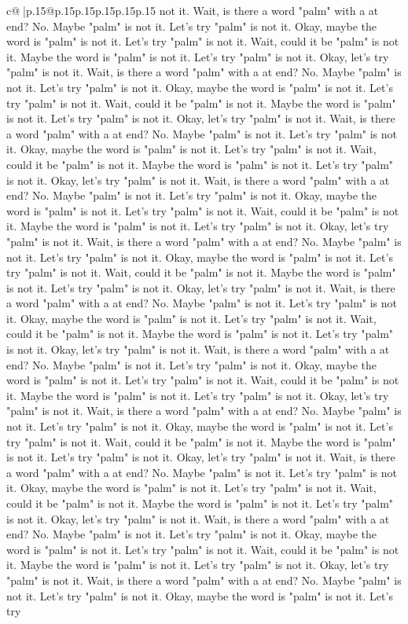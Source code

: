 \documentclass{article}
\begin{document}
{\begin{supertabular}{c@{$\;$}|p{.15\linewidth}@{}p{.15\linewidth}p{.15\linewidth}p{.15\linewidth}p{.15\linewidth}p{.15\linewidth}}
{{{not it. Wait, is there a word "palm" with a at end? No. Maybe "palm" is not it. Let's try "palm" is not it. Okay, maybe the word is "palm" is not it. Let's try "palm" is not it. Wait, could it be "palm" is not it. Maybe the word is "palm" is not it. Let's try "palm" is not it. Okay, let's try "palm" is not it. Wait, is there a word "palm" with a at end? No. Maybe "palm" is not it. Let's try "palm" is not it. Okay, maybe the word is "palm" is not it. Let's try "palm" is not it. Wait, could it be "palm" is not it. Maybe the word is "palm" is not it. Let's try "palm" is not it. Okay, let's try "palm" is not it. Wait, is there a word "palm" with a at end? No. Maybe "palm" is not it. Let's try "palm" is not it. Okay, maybe the word is "palm" is not it. Let's try "palm" is not it. Wait, could it be "palm" is not it. Maybe the word is "palm" is not it. Let's try "palm" is not it. Okay, let's try "palm" is not it. Wait, is there a word "palm" with a at end? No. Maybe "palm" is not it. Let's try "palm" is not it. Okay, maybe the word is "palm" is not it. Let's try "palm" is not it. Wait, could it be "palm" is not it. Maybe the word is "palm" is not it. Let's try "palm" is not it. Okay, let's try "palm" is not it. Wait, is there a word "palm" with a at end? No. Maybe "palm" is not it. Let's try "palm" is not it. Okay, maybe the word is "palm" is not it. Let's try "palm" is not it. Wait, could it be "palm" is not it. Maybe the word is "palm" is not it. Let's try "palm" is not it. Okay, let's try "palm" is not it. Wait, is there a word "palm" with a at end? No. Maybe "palm" is not it. Let's try "palm" is not it. Okay, maybe the word is "palm" is not it. Let's try "palm" is not it. Wait, could it be "palm" is not it. Maybe the word is "palm" is not it. Let's try "palm" is not it. Okay, let's try "palm" is not it. Wait, is there a word "palm" with a at end? No. Maybe "palm" is not it. Let's try "palm" is not it. Okay, maybe the word is "palm" is not it. Let's try "palm" is not it. Wait, could it be "palm" is not it. Maybe the word is "palm" is not it. Let's try "palm" is not it. Okay, let's try "palm" is not it. Wait, is there a word "palm" with a at end? No. Maybe "palm" is not it. Let's try "palm" is not it. Okay, maybe the word is "palm" is not it. Let's try "palm" is not it. Wait, could it be "palm" is not it. Maybe the word is "palm" is not it. Let's try "palm" is not it. Okay, let's try "palm" is not it. Wait, is there a word "palm" with a at end? No. Maybe "palm" is not it. Let's try "palm" is not it. Okay, maybe the word is "palm" is not it. Let's try "palm" is not it. Wait, could it be "palm" is not it. Maybe the word is "palm" is not it. Let's try "palm" is not it. Okay, let's try "palm" is not it. Wait, is there a word "palm" with a at end? No. Maybe "palm" is not it. Let's try "palm" is not it. Okay, maybe the word is "palm" is not it. Let's try "palm" is not it. Wait, could it be "palm" is not it. Maybe the word is "palm" is not it. Let's try "palm" is not it. Okay, let's try "palm" is not it. Wait, is there a word "palm" with a at end? No. Maybe "palm" is not it. Let's try "palm" is not it. Okay, maybe the word is "palm" is not it. Let's try }}}
\end{supertabular}}
\end{document}
